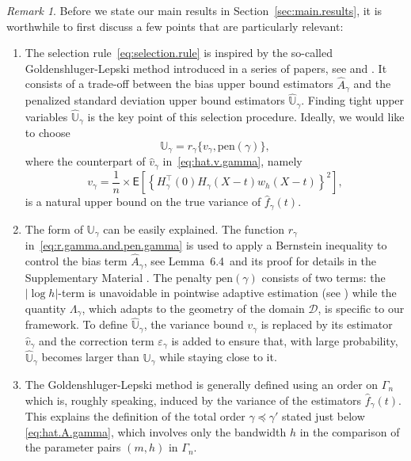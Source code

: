 \documentclass[bj,authoryear]{imsart}
\numberwithin{equation}{section}
\theoremstyle{plain}
\theoremstyle{remark}
\newtheorem{remark}{Remark}
\newcommand{\EE}{\mathsf{E}}
\newcommand{\1}{\mathds{1}}
\newcommand{\domain}{\mathcal{D}}
\newcommand{\lemBernsteinone}{6.4~}
\begin{document}
    \begin{remark}\upshape
        Before we state our main results in Section~\ref{sec:main.results}, it is worthwhile to first discuss a few points that are particularly relevant:
        \begin{enumerate}
            \item The selection rule~\eqref{eq:selection.rule} is inspired by the so-called Goldenshluger-Lepski method introduced in a series of papers, see \cite{Lepski1991adaptive} and \cite{GoldenshlugerLepski2008,GoldenshlugerLepski2009,GoldenshlugerLepski2011,GoldenshlugerLepski2014}. It consists of a trade-off between the bias upper bound estimators $\hat{A}_{\gamma}$ and the penalized standard deviation upper bound estimators $\hat{\mathbb{U}}_{\gamma}$. Finding tight upper variables $\hat{\mathbb{U}}_{\gamma}$ is the key point of this selection procedure. Ideally, we would like to choose
                \begin{equation}\label{eq:U.gamma}
                    \mathbb{U}_{\gamma} = r_{\gamma}\{v_{\gamma},\mathrm{pen}(\gamma)\},
                \end{equation}
                where the counterpart of $\hat{v}_{\gamma}$ in~\eqref{eq:hat.v.gamma}, namely
                \begin{equation}\label{eq:v.gamma}
                    v_{\gamma} = \frac{1}{n} \times \EE\left[\left\{H_{\gamma}^{\top}(0)H_{\gamma}(X-t) w_h(X-t)\right\}^2\right],
                \end{equation}
                is a natural upper bound on the true variance of $\hat{f}_{\gamma}(t)$.
            \item The form of $\mathbb{U}_{\gamma}$ can be easily explained. The function $r_{\gamma}$ in~\eqref{eq:r.gamma.and.pen.gamma} is used to apply a Bernstein inequality to control the bias term $\hat{A}_{\gamma}$, see Lemma~\lemBernsteinone and its proof for details in the Supplementary Material \citep{BertinKlutchnikoffOuimet2024supplement}. The penalty $\mathrm{pen}(\gamma)$ consists of two terms: the $\lvert\log h\rvert$-term is unavoidable in pointwise adaptive estimation (see \cite{Lepski1991adaptive}) while the quantity $\Lambda_{\gamma}$, which adapts to the geometry of the domain $\domain$, is specific to our framework. To define $\hat{\mathbb{U}}_{\gamma}$, the variance bound $v_{\gamma}$ is replaced by its estimator $\hat{v}_{\gamma}$ and the correction term $\varepsilon_{\gamma}$ is added to ensure that, with large probability, $\hat{\mathbb{U}}_{\gamma}$ becomes larger than $\mathbb{U}_{\gamma}$ while staying close to it.
            \item The Goldenshluger-Lepski method is generally defined using an order on $\Gamma_{\!n}$ which is, roughly speaking, induced by the variance of the estimators $\hat{f}_{\gamma}(t)$. This explains the definition of the total order $\gamma\preceq\gamma'$ stated just below \eqref{eq:hat.A.gamma}, which involves only the bandwidth $h$ in the comparison of the parameter pairs $(m,h)$ in $\Gamma_{\!n}$.
        \end{enumerate}
    \end{remark}
\end{document}
